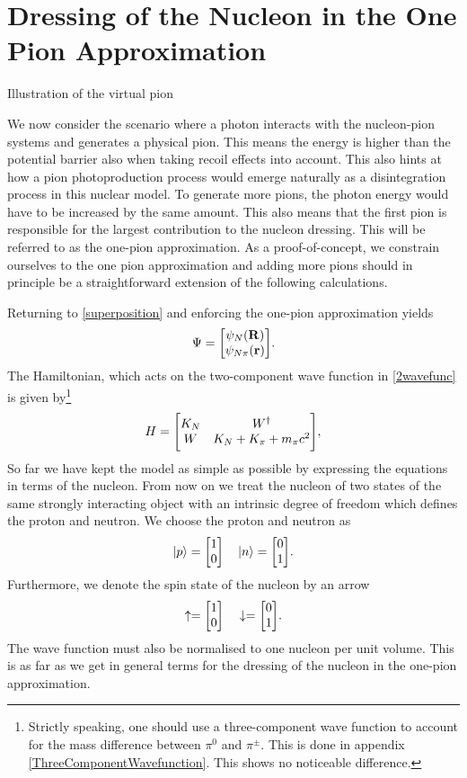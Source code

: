 \section{Dressing of the Nucleon in the One Pion Approximation}\label{dressnuc}
\begin{marginfigure}
	\centering
	
	\caption{Illustration of the virtual pion}
	\label{fig:Underbarrier}
\end{marginfigure}
We now consider the scenario where a photon interacts with the nucleon-pion systems and generates a physical pion. This means the energy is higher than the potential barrier also when taking recoil effects into account. This also hints at how a pion photoproduction process would emerge naturally as a disintegration process in this nuclear model. To generate more pions, the photon energy would have to be increased by the same amount. This also means that the first pion is responsible for the largest contribution to the nucleon dressing. This will be referred to as the one-pion approximation. As a proof-of-concept, we constrain ourselves to the one pion approximation and adding more pions should in principle be a straightforward extension of the following calculations.

Returning to \eqref{superposition} and enforcing the one-pion approximation yields
\begin{equation} \label{2wavefunc}
	\Psi = \mqty[\psi_{N}(\vec{R})\\
	\psi_{N\pi}(\vec{r})].
\end{equation}
The Hamiltonian, which acts on the two-component wave function in \eqref{2wavefunc} is given by\footnote{Strictly speaking, one should use a three-component wave function to account for the mass difference between $\pi^0$ and $\pi^\pm$. This is done in appendix \ref{ThreeComponentWavefunction}. This shows no noticeable difference.}
\begin{equation}\label{HamilTwo}
	H  =  \mqty[K_N & W^\dagger \\ W & K_N+K_\pi+m_\pi c^2],
\end{equation}
So far we have kept the model as simple as possible by expressing the equations in terms of the nucleon. From now on we treat the nucleon of two states of the same strongly interacting object with an intrinsic degree of freedom which defines the proton and neutron. We choose the proton and neutron as 
\begin{equation} \label{isospinvec}
	\ket{p} = \mqty[1 \\ 0 ] \quad \ket{n} = \mqty[0 \\ 1].
\end{equation} 
Furthermore, we denote the spin state of the nucleon by an arrow
\begin{equation} \label{spinvec}
	\uparrow = \mqty[1 \\ 0 ] \quad  \downarrow= \mqty[0 \\ 1].
\end{equation}
The wave function must also be normalised to one nucleon per unit volume. This is as far as we get in general terms for the dressing of the nucleon in the one-pion approximation.
